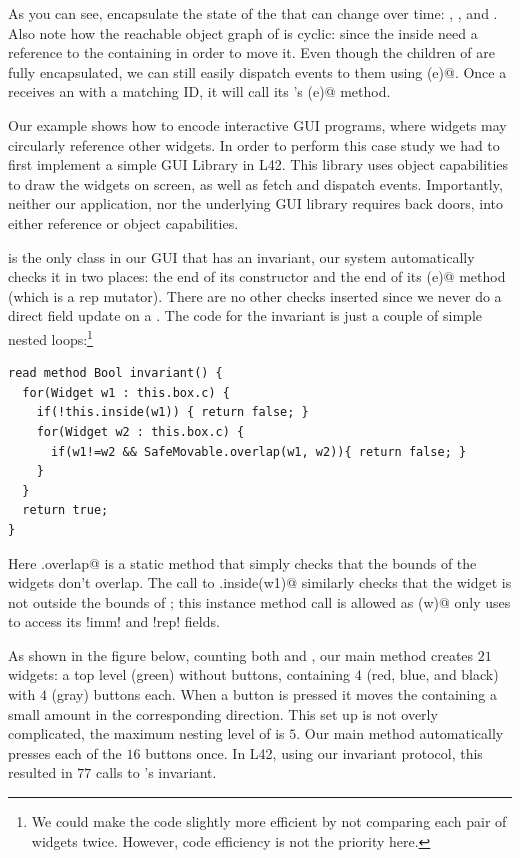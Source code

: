As you can see, \Q@Box@es encapsulate the state of the \Q@SafeMovable@s that can change over time:
\Q@left@, \Q@top@, and \Q@children@. Also note how the reachable object graph of \Q@Box@ is cyclic: since
the \Q@MoveAction@s inside \Q@Button@s need a reference to the containing \Q@Box@ in order to move it.
Even though the children of \Q@SafeMovable@s are fully encapsulated, we can still easily dispatch events to them using \Q@dispatch(e)@. Once a \Q@Button@ receives an \Q@Event@ with a matching ID, it will call its \Q@Action@'s \Q@process(e)@ method. 

Our example shows how to encode interactive GUI programs, where widgets may circularly reference other widgets.
In order to perform this case study we had to first implement a simple GUI Library in L42. This library uses object capabilities to draw the widgets on screen, as well as fetch and dispatch events. Importantly, neither our application, nor the underlying GUI library requires back doors, into either reference or object capabilities.

\Q@SafeMovable@ is the only class in our GUI that has an invariant, our system automatically checks it in two places: the end of its constructor and the end of its \Q@dispatch(e)@ method (which is a rep mutator). There are no other checks inserted since we never do a direct field update on a \Q@SafeMovable@. The code for the invariant is just a couple of simple nested loops:\footnote{
\IO[22]{}We could make the code slightly more efficient by not comparing each pair of widgets twice. However, code efficiency is not the priority here.
}
\begin{lstlisting}
read method Bool invariant() {
  for(Widget w1 : this.box.c) {
    if(!this.inside(w1)) { return false; }
    for(Widget w2 : this.box.c) {
      if(w1!=w2 && SafeMovable.overlap(w1, w2)){ return false; } 
    }
  }
  return true;
}
\end{lstlisting}

Here \Q@SafeMovable.overlap@ is a static method that simply checks that the bounds of the widgets don't overlap. The call to \Q@this.inside(w1)@ similarly checks that the widget is not outside the bounds of \Q@this@; this instance method call is allowed as \Q@inside(w)@ only uses \Q@this@ to access its \Q!imm! and \Q!rep! fields.

As shown in the figure below, counting both \Q@SafeMovable@s and \Q@Button@s, our main method creates $21$ widgets: a top level (green) \Q@SafeMovable@ without buttons, containing $4$ (red, blue, and black) \Q@SafeMovable@s with
$4$ (gray) buttons each. When a button is pressed it moves the containing \Q@SafeMovable@ a small amount in the corresponding direction.
This set up is not overly complicated, the maximum nesting level of \Q@Widget@s is $5$.
Our main method automatically presses each of the $16$ buttons once. In L42, using our invariant protocol, this resulted in $77$ calls to \Q@SafeMovable@'s invariant. 

